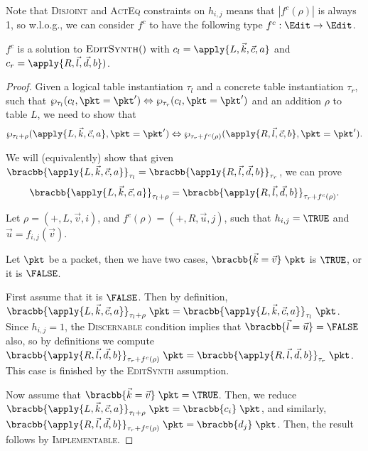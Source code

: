 Note that \textsc{Disjoint} and \textsc{ActEq} constraints on
$h_{i,j}$ means that $|f^c(\rho)|$ is always 1, so w.l.o.g., we can
consider $f^c$ to have the following type $f^c : \Edit \to \Edit$.

\begin{theorem}
  $f^c$ is a solution to
  $\textsc{EditSynth}()$ with $c_l = \apply{L, \vec k, \vec c, a}$ and $c_r = \apply{R,\vec l,
    \vec d, b})$.
\end{theorem}

\begin{proof}
  Given a logical table instantiation $\tau_l$ and a concrete table
  instantiation $\tau_r$, such that
  $\wp_{\tau_l}(c_l, \pkt = \pkt') \Leftrightarrow \wp_{\tau_r}(c_l,
  \pkt = \pkt')$ and an addition $\rho$ to table $L$, we need to show that
  \[\wp_{\tau_l + \rho}(\apply{L, \vec k, \vec c, a}, \pkt = \pkt') \Leftrightarrow
    \wp_{\tau_r + f^c(\rho)}(\apply{R, \vec l, \vec c, b}, \pkt = \pkt').\]

  We will (equivalently) show that given
  $\bracbb{\apply{L, \vec k, \vec c, a}}_{\tau_l} =
  \bracbb{\apply{R,\vec l, \vec d, b}}_{\tau_r}$, we can prove
  \[\bracbb{\apply{L, \vec k, \vec c, a}}_{\tau_l + \rho} =
    \bracbb{\apply{R,\vec l, \vec d, b}}_{\tau_r + f^c(\rho)}.\]

  Let $\rho = (+, L, \vec v, i)$, and $f^c(\rho) = (+, R, \vec u, j)$,
  such that $h_{i,j} = \TRUE$ and $\vec u = f_{i,j}(\vec v)$.

  Let $\pkt$ be a packet, then we have two cases,
  $\bracbb{\vec k = \vec v}\;\pkt$ is $\TRUE$, or it is $\FALSE$.
  
  First assume that it is $\FALSE$. Then by definition,
  $\bracbb{\apply{L, \vec k, \vec c, a}}_{\tau_l + \rho}\;\pkt =
  \bracbb{\apply{L, \vec k, \vec c, a}}_{\tau_l}\; \pkt$. Since
  $h_{i,j} = 1$, the \textsc{Discernable} condition implies that
  $\bracbb{\vec l = \vec u} = \FALSE$ also, so by definitions we
  compute
  $\bracbb{\apply{R,\vec l, \vec d, b}}_{\tau_r + f^c(\rho)}\; \pkt =
  \bracbb{\apply{R,\vec l, \vec d, b}}_{\tau_r}\; \pkt$. This case is
  finished by the \textsc{EditSynth} assumption.

  Now assume that $\bracbb{\vec k = \vec v}\;\pkt = \TRUE$. Then, we
  reduce
  $\bracbb{\apply{L, \vec k, \vec c, a}}_{\tau_l + \rho}\;\pkt =
  \bracbb{c_i}\;\pkt$, and similarly,
  $\bracbb{\apply{R,\vec l, \vec d, b}}_{\tau_r + f^c(\rho)}\; \pkt =
  \bracbb{d_j}\; \pkt$. Then, the result follows by \textsc{Implementable}.


\end{proof}



